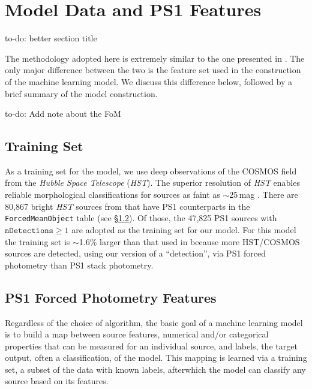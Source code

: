 \documentclass[twocolumn]{aastex63}
\newcommand{\todo}[1]{{\color{magenta} to-do: {#1}}}
\begin{document}
\section{Model Data and PS1 Features}

\todo{better section title}

The methodology adopted here is extremely similar to the one presented in
\citep{Tachibana18}. The only major difference between the two is the feature
set used in the construction of the machine learning model. We discuss this
difference below, followed by a brief summary of the model construction.

\todo{Add note about the FoM}

\subsection{Training Set}

As a training set for the model, we use deep observations of the COSMOS field
from the \textit{Hubble Space Telescope} (\textit{HST}). The superior
resolution of \textit{HST} enables reliable morphological classifications for
sources as faint as $\sim$25\,mag \citep{Leauthaud07}. There are 80,867 bright
\textit{HST} sources from \citet{Leauthaud07} that have PS1 counterparts
\citep[within a 1\arcsec match radius; see][]{Tachibana18} in the
\texttt{ForcedMeanObject} table (see \S\ref{sec:features}). Of those, the
47,825 PS1 sources with $\mathtt{nDetections} \ge 1$ are adopted as the
training set for our model. For this model the training set is $\sim$1.6\%
larger than that used in \citet{Tachibana18} because more HST/COSMOS sources
are detected, using our version of a ``detection'', via PS1 forced photometry
than PS1 stack photometry.

\subsection{PS1 Forced Photometry Features}\label{sec:features}

Regardless of the choice of algorithm, the basic goal of a machine learning
model is to build a map between source features, numerical and/or categorical
properties that can be measured for an individual source, and labels, the
target output, often a classification, of the model. This mapping is learned
via a training set, a subset of the data with known labels, afterwhich the
model can classify any source based on its features.
\end{document}
